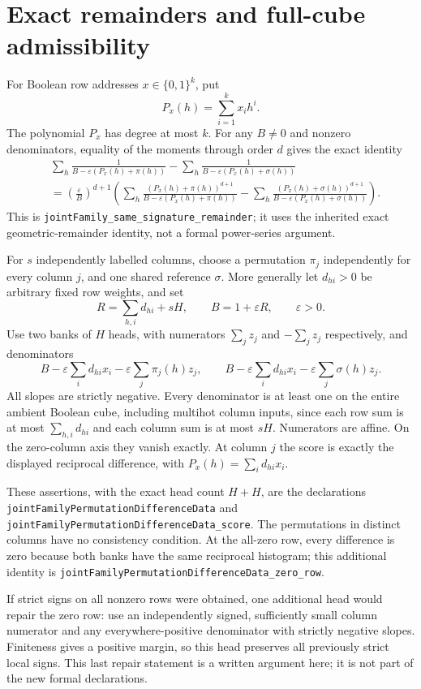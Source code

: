 \documentclass{article}
\begin{document}
\section{Exact remainders and full-cube admissibility}
For Boolean row addresses $x\in\{0,1\}^k$, put
\[
 P_x(h)=\sum_{i=1}^k x_i h^i.
\]
The polynomial $P_x$ has degree at most $k$. For any $B\neq0$ and
nonzero denominators, equality of the moments through order $d$ gives
the exact identity
\[
\begin{split}
 &\sum_h\frac1{B-\varepsilon(P_x(h)+\pi(h))}
 -\sum_h\frac1{B-\varepsilon(P_x(h)+\sigma(h))}\\
 &=\left(\frac\varepsilon B\right)^{d+1}
 \left(\sum_h\frac{(P_x(h)+\pi(h))^{d+1}}
 {B-\varepsilon(P_x(h)+\pi(h))}
 -\sum_h\frac{(P_x(h)+\sigma(h))^{d+1}}
 {B-\varepsilon(P_x(h)+\sigma(h))}\right).
\end{split}
\]
This is \texttt{jointFamily\_same\_signature\_remainder}; it uses the
inherited exact geometric-remainder identity, not a formal power-series
argument.

For $s$ independently labelled columns, choose a permutation $\pi_j$
independently for every column $j$, and one shared reference $\sigma$.
More generally let $d_{hi}>0$ be arbitrary fixed row weights, and set
\[
 R=\sum_{h,i}d_{hi}+sH,\qquad B=1+\varepsilon R,
 \qquad \varepsilon>0.
\]
Use two banks of $H$ heads, with numerators $\sum_jz_j$ and
$-\sum_jz_j$ respectively, and denominators
\[
 B-\varepsilon\sum_i d_{hi}x_i
   -\varepsilon\sum_j\pi_j(h)z_j,
 \qquad
 B-\varepsilon\sum_i d_{hi}x_i
   -\varepsilon\sum_j\sigma(h)z_j.
\]
All slopes are strictly negative. Every denominator is at least one
on the entire ambient Boolean cube, including multihot column inputs,
since each row sum is at most $\sum_{h,i}d_{hi}$ and each column sum
is at most $sH$. Numerators are affine. On the zero-column axis they
vanish exactly. At column $j$ the score is exactly the displayed
reciprocal difference, with $P_x(h)=\sum_i d_{hi}x_i$.

These assertions, with the exact head count $H+H$, are the declarations
\texttt{jointFamilyPermutationDifferenceData} and
\texttt{jointFamilyPermutationDifferenceData\_score}. The permutations
in distinct columns have no consistency condition. At the all-zero row,
every difference is zero because both banks have the same reciprocal
histogram; this additional identity is
\texttt{jointFamilyPermutationDifferenceData\_zero\_row}.

If strict signs on all nonzero rows were obtained, one additional head
would repair the zero row: use an independently signed, sufficiently
small column numerator and any everywhere-positive denominator with
strictly negative slopes. Finiteness gives a positive margin, so this
head preserves all previously strict local signs. This last repair
statement is a written argument here; it is not part of the new formal
declarations.
\end{document}
